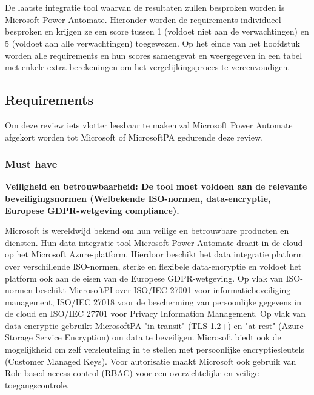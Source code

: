 \chapter{}
\label{ch:Microsoft}

De laatste integratie tool waarvan de resultaten zullen besproken worden is Microsoft Power Automate. Hieronder worden de requirements individueel besproken en krijgen ze een score tussen 1 (voldoet niet aan de verwachtingen) en 5 (voldoet aan alle verwachtingen) toegewezen. Op het einde van het hoofdstuk worden alle requirements en hun scores samengevat en weergegeven in een tabel met enkele extra berekeningen om het vergelijkingsproces te vereenvoudigen.

\section{Requirements}%
\label{RequirementsMicrosoft}

Om deze review iets vlotter leesbaar te maken zal Microsoft Power Automate afgekort worden tot Microsoft of MicrosoftPA gedurende deze review.

\subsection{Must have}%
\label{MustHaveMicrosoft}

\textbf{Veiligheid en betrouwbaarheid: De tool moet voldoen aan de relevante beveiligingsnormen (Welbekende ISO-normen, data-encryptie, Europese GDPR-wetgeving compliance).}

\vspace{\baselineskip}

Microsoft is wereldwijd bekend om hun veilige en betrouwbare producten en diensten. Hun data integratie tool Microsoft Power Automate draait in de cloud op het Microsoft Azure-platform. Hierdoor beschikt het data integratie platform over verschillende ISO-normen, sterke en flexibele data-encryptie en voldoet het platform ook aan de eisen van de Europese GDPR-wetgeving. Op vlak van ISO-normen beschikt MicrosoftPI over ISO/IEC 27001 voor informatiebeveiliging management, ISO/IEC 27018 voor de bescherming van persoonlijke gegevens in de cloud en ISO/IEC 27701 voor Privacy Information Management. Op vlak van data-encryptie gebruikt MicrosoftPA "in transit" (TLS 1.2+) en "at rest" (Azure Storage Service Encryption) om data te beveiligen. Microsoft biedt ook de mogelijkheid om zelf versleuteling in te stellen met persoonlijke encryptiesleutels (Customer Managed Keys). Voor autorisatie maakt Microsoft ook gebruik van Role-based access control (RBAC) voor een overzichtelijke en veilige toegangscontrole.



